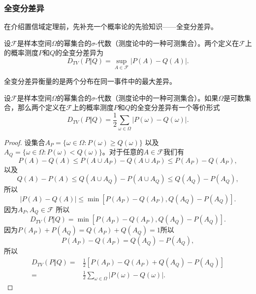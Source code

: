 \subsubsection{全变分差异}
在介绍置信域定理前，先补充一个概率论的先验知识——全变分差异\cite{billingsley2008probability}。
\begin{definition}
    设$\mathcal{F}$是样本空间$\Omega$的幂集合的$\sigma$-代数（测度论中的一种可测集合）。两个定义在$\mathcal{F}$上的概率测度$P$和$Q$的全变分差异为
    \begin{equation}
        D_{TV}(P \Vert Q) = \sup_{A \in \mathcal{F}} \vert P(A) - Q(A) \vert.
    \end{equation}
\end{definition}
全变分差异衡量的是两个分布在同一事件中的最大差异。
\begin{lemma}
    设$\mathcal{F}$是样本空间$\Omega$的幂集合的$\sigma$-代数（测度论中的一种可测集合）。如果$\Omega$是可数集合，那么两个定义在$\mathcal{F}$上的概率测度$P$和$Q$的全变分差异有一个等价形式
    \begin{equation}
        D_{TV}(P \Vert Q) = \frac{1}{2} \sum_{\omega \in \Omega}\vert P(\omega) - Q(\omega) \vert.
    \end{equation}
\end{lemma}
\begin{proof}
    设集合$A_P = \{\omega \in \Omega: P(\omega) \ge Q(\omega)\}$ 以及 $A_Q = \{\omega \in \Omega: P(\omega) < Q(\omega)\}$。对于任意的$A \in \mathcal{F}$我们有
    \begin{equation*}
        P(A) - Q(A) \le P(A \cup A_P) - Q(A \cup A_P) \le P(A_P) - Q(A_P),
    \end{equation*}
    以及
    \begin{equation*}
        Q(A) - P(A) \le Q(A \cup A_Q) - P(A \cup A_Q) \le Q(A_Q) - P(A_Q),
    \end{equation*}
    所以
    \begin{equation*}
        \vert P(A) - Q(A) \vert \le \min[P(A_P) - Q(A_P), Q(A_Q) - P(A_Q)].
    \end{equation*}
    因为$A_P, A_Q \in \mathcal{F}$ 所以
    \begin{equation*}
        D_{TV}(P \Vert Q) = \min[P(A_P) - Q(A_P), Q(A_Q) - P(A_Q)].
    \end{equation*}
    因为$P(A_P) + P(A_Q) = Q(A_P) + Q(A_Q) = 1$所以
    \begin{equation*}
        P(A_P) - Q(A_P) = Q(A_Q) - P(A_Q),
    \end{equation*}
    所以
    \begin{align*}
        D_{TV}(P \Vert Q) =& \frac{1}{2}[P(A_P) - Q(A_P) + Q(A_Q) - P(A_Q)]\\
        =& \frac{1}{2} \sum_{\omega \in \Omega} \vert P(\omega) - Q(\omega) \vert.
    \end{align*}
\end{proof}

